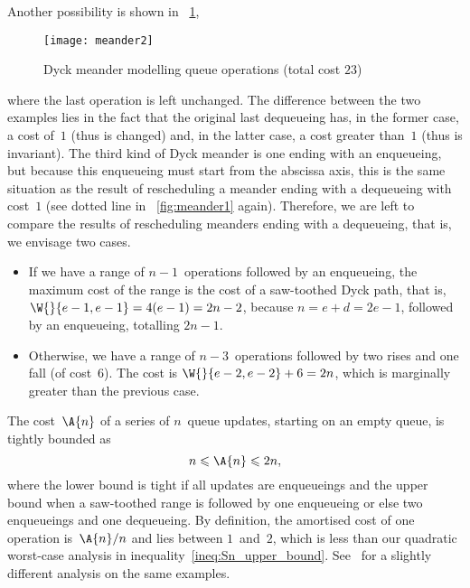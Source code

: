 Another possibility is shown in \fig~\ref{fig:meander2},
\begin{figure}[t]
\centering
\texttt{[image: meander2]}
\caption{Dyck meander modelling queue operations (total cost \(23\))}
\label{fig:meander2}
\end{figure}
where the last operation is left unchanged. The difference between the
two examples lies in the fact that the original last dequeueing has,
in the former case, a cost of~\(1\) (thus is changed) and, in the
latter case, a cost greater than~\(1\) (thus is invariant). The third
kind of Dyck meander is one ending with an enqueueing, but because
this enqueueing must start from the abscissa axis, this is the same
situation as the result of rescheduling a meander ending with a
dequeueing with cost~\(1\) (see dotted line in \fig~\ref{fig:meander1}
again). Therefore, we are left to compare the results of rescheduling
meanders ending with a dequeueing, that is, we envisage two cases.
\begin{itemize}

  \item If we have a range of \(n-1\)~operations followed by an
    enqueueing, the maximum cost of the range is the cost of a
    saw\hyp{}toothed Dyck path, that is,
    \(\W{}{e-1,e-1}=4(e-1)=2n-2\), because \(n=e+d=2e-1\), followed by
    an enqueueing, totalling \(2n-1\).

  \item Otherwise, we have a range of \(n-3\)~operations followed by
    two rises and one fall (of cost~\(6\)). The cost is
    \(\W{}{e-2,e-2}+6=2n\), which is marginally greater than the
    previous case.

\end{itemize}


The cost~\(\A{n}\) of a series of \(n\)~queue updates, starting on an
empty queue, is tightly bounded as
\begin{equation*}
n \leqslant \A{n} \leqslant 2n,
\end{equation*}
where the lower bound is tight if all updates are enqueueings and the
upper bound when a saw\hyp{}toothed range is followed by one
enqueueing or else two enqueueings and one dequeueing. By definition,
the amortised cost of one operation is~\(\A{n}/n\) and lies between
\(1\)~and~\(2\), which is less than our quadratic worst\hyp{}case
analysis in
inequality~\eqref{ineq:Sn_upper_bound}. See~\citep{Rinderknecht_2011}
for a slightly different analysis on the same examples.

